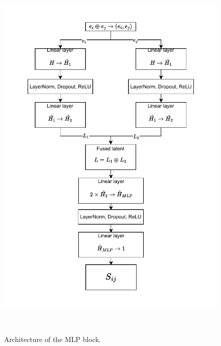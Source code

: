 \begin{figure}[H]   
    \centering
    \includegraphics[scale=1]{figs/MLP_arch.pdf}
    \caption{Architecture of the MLP block.}
    ~\label{fig:file_attention_MLP_arch}
\end{figure}

